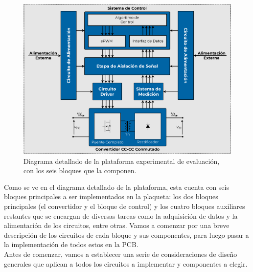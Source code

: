 \begin{figure}[h]
    \centering
    \includegraphics[scale=0.4]{Imagenes/Plataforma Detallada.pdf}
    \caption{Diagrama detallado de la plataforma experimental de evaluación, con los seis bloques que la componen.}
    \label{fig:plataforma_det}
\end{figure}

Como se ve en el diagrama detallado de la plataforma, esta cuenta con seis bloques principales a ser implementados en la plaqueta: los dos bloques principales (el convertidor y el bloque de control) y los cuatro bloques auxiliares restantes que se encargan de diversas tareas como la adquisición de datos y la alimentación de los circuitos, entre otras. Vamos a comenzar por una breve descripción de los circuitos de cada bloque y sus componentes, para luego pasar a la implementación de todos estos en la PCB.\\

Antes de comenzar, vamos a establecer una serie de consideraciones de diseño generales que aplican a todos los circuitos a implementar y componentes a elegir.\\



\newpage



\newpage



\newpage